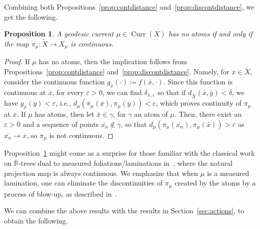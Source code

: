 \documentclass[12pt,article]{amsart}
\numberwithin{equation}{section}
\numberwithin{figure}{section}
\newtheorem{proposition}[equation]{Proposition}
\theoremstyle{definition}
\theoremstyle{plain}
\DeclareMathOperator{\Curr}{Curr}
\newcommand*{\wt}[1]{\widetilde{#1}}
\renewcommand{\epsilon}{\varepsilon}
\begin{document}
Combining both Propositions~\ref{prop:contdistance} and~\ref{prop:discontdistance}, we get the following.

\begin{proposition}
A geodesic current $\mu \in \Curr(X)$ has no atoms 
if and only if the map $\pi_{\mu} \colon \wt{X} \to X_{\mu}$ is continuous. 
\label{prop:continuousproj}
\end{proposition}
\begin{proof}
If $\mu$ has no atoms, then the implication follows from Propositions~\ref{prop:contdistance} and~\ref{prop:discontdistance}. Namely, for $\overline{x} \in \wt{X}$, consider the continuous function $g_{\overline{x}}(\cdot) \coloneqq f(\overline{x},\cdot)$. Since this function is continuous at $\overline{x}$, for every $\epsilon>0$, we can find $\delta_{\overline{x},\epsilon}$ so that if $d_{\wt{X}}(\overline{x},\overline{y})<\delta$, we have $g_{\overline{x}}(\overline{y})<\epsilon$, i.e.,  $d_{\mu}(\pi_{\mu}(\overline{x}), \pi_{\mu}(\overline{y}))<\epsilon$, which proves continuity of $\pi_{\mu}$ at $\overline{x}$.
If $\mu$ has atoms, then let $\bar{x} \in \gamma$, for $\gamma$ an atom of $\mu$.
Then, there exist an $\epsilon>0$ and a sequence of points $\overline{x_n} \notin \gamma$, so that $d_{\mu}(\pi_{\mu}(\bar{x_n}),\pi_{\mu}(\bar{x}))> \epsilon$ as $\overline{x_n} \to \overline{x}$, so $\pi_{\mu}$ is not continuous.
\end{proof}


Proposition~\ref{prop:continuousproj} might come as a surprise for those familiar with the classical work on $\mathbb{R}$-trees dual to measured foliations/laminations in~\cite{W98:Duals}, where the natural projection map is always continuous.
We emphasize that when $\mu$ is a measured lamination, one can eliminate the discontinuities of $\pi_{\mu}$ created by the atoms by a process of blow-up, as described in~\cite[Defintion~11.27]{Kap00:Kapovich2000HyperbolicMA}. 

We can combine the above results with the results in Section~\ref{sec:actions}, to obtain the following.
\end{document}
